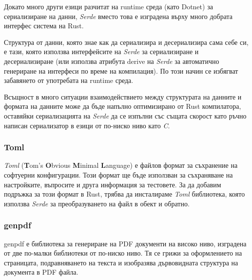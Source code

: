 Докато много други езици разчитат на runtime среда (като Dotnet) за
сериализиране на данни, \textit{Serde} вместо това е изградена върху много добрата
интерфес система на Rust.

Структура от данни, която знае как да сериализира и десериализира сама себе си,
е тази, която използва интерфейсите на \textit{Serde} за сериализиране и десериализиране
(или използва атрибута derive на \textit{Serde} за автоматично генериране на интерфеси
по време на компилация). По този начин се избягват забавянето от употребата на
runtime среда.

Всъщност в много ситуации взаимодействието между структурата на данните и
формата на данните може да бъде напълно оптимизирано от Rust компилатора,
оставяйки сериализацията на \textit{Serde} да се изпълни със същата скорост като
ръчно написан сериализатор в езици от по-ниско ниво като \textit{C}.

\subsubsection{Toml}
\textit{Toml} (\textbf{T}om's \textbf{O}bvious \textbf{M}inimal \textbf{L}anguage) е
файлов формат за съхранение на софтуерни конфигурации. Този формат ще бъде
използван за съхраняване на настройките, въпросите и друга информация за
тестовете. За да добавим подръжка за този формат в Rust, трябва да инсталираме
\textit{Toml} библиотека, която използва \textit{Serde} за преобразуването на файл в
обект и обратно.


\subsubsection{genpdf}
genpdf е библиотека за генериране на PDF документи на високо ниво, изградена от
две по-малки библиотеки от по-ниско ниво. Тя се грижи за оформлението на
страницата, подравняването на текста и изобразява дървовидната структура на
документа в PDF файла.
